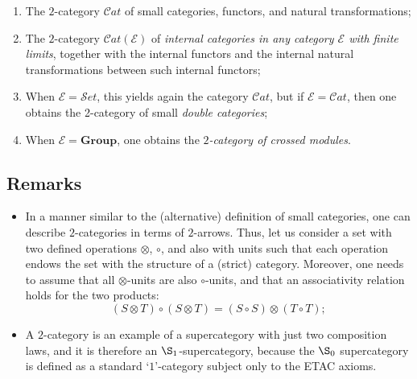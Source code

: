 \documentclass[12pt]{article}
\theoremstyle{plain}
\theoremstyle{definition}
\numberwithin{equation}{section}
\begin{document}
\begin{enumerate}
\item The $2$-category $\mathcal{C}at$ of small categories, functors, and natural transformations;
\item The $2$-category $\mathcal{C}at(\mathcal{E})$ of \emph{internal categories in any category $\mathcal{E}$ with
finite limits}, together with the internal functors and the internal natural transformations between such internal
functors; 
\item When $\mathcal{E} = \mathcal{S}et$, this yields again the category $\mathcal{C}at$, but if 
$\mathcal{E} = \mathcal{C}at$, then one obtains the 2-category of small \emph{double categories}; 
\item When $\mathcal{E} = \textbf{Group}$, one obtains the \emph{$2$-category of crossed modules}.
\end{enumerate} 

\subsection{Remarks}
\begin{itemize}
\item  In a manner similar to the (alternative) definition of small categories, one can 
describe $2$-categories in terms of $2$-arrows. Thus, let us consider a set with two defined operations 
$\otimes$, $\circ$, and also with units such that each operation endows the set with the structure of a 
(strict) category. Moreover, one needs to assume that all $\otimes$-units are also $\circ$-units, and that an associativity relation holds for the two products: 
$$(S \otimes T ) \circ (S \otimes T) = (S \circ S) \otimes (T \circ T);$$
\item A $2$-category is an example of a supercategory with just two composition laws, and it
is therefore an $\S_1$-supercategory, because the $\S_0$ supercategory is defined as a standard `$1$'-category subject only to the ETAC axioms.

\end{itemize}

\end{document}
